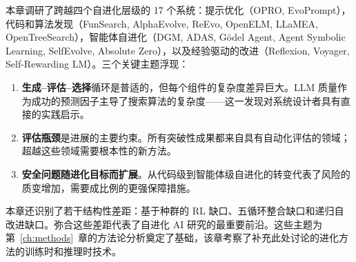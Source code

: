 本章调研了跨越四个自进化层级的 17 个系统：提示优化（OPRO, EvoPrompt），代码和算法发现（FunSearch, AlphaEvolve, ReEvo, OpenELM, LLaMEA, OpenTreeSearch），智能体自进化（DGM, ADAS, G\"{o}del Agent, Agent Symbolic Learning, SelfEvolve, Absolute Zero），以及经验驱动的改进（Reflexion, Voyager, Self-Rewarding LM）。三个关键主题浮现：

\begin{enumerate}
    \item \textbf{生成--评估--选择}循环是普适的，但每个组件的复杂度差异巨大。LLM 质量作为成功的预测因子主导了搜索算法的复杂度——这一发现对系统设计者具有直接的实践启示。
    \item \textbf{评估瓶颈}是进展的主要约束。所有突破性成果都来自具有自动化评估的领域；超越这些领域需要根本性的新方法。
    \item \textbf{安全问题随进化目标而扩展}。从代码级到智能体级自进化的转变代表了风险的质变增加，需要成比例的更强保障措施。
\end{enumerate}

本章还识别了若干结构性差距：基于种群的 RL 缺口、五循环整合缺口和递归自改进缺口。弥合这些差距代表了自进化 AI 研究的最重要前沿。这些主题为第~\ref{ch:methods}~章的方法论分析奠定了基础，该章考察了补充此处讨论的进化方法的训练时和推理时技术。
